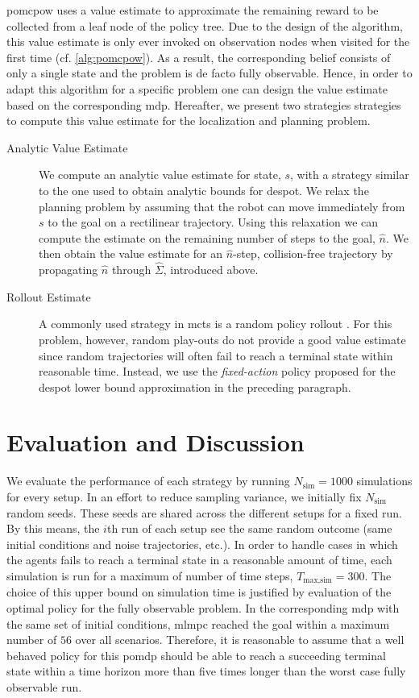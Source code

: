 \ac{pomcpow} uses a value estimate to approximate the remaining reward to be
collected from a leaf node of the policy tree. Due to the design of the
algorithm, this value estimate is only ever invoked on observation nodes when
visited for the first time (cf. \cref{alg:pomcpow}). As a result, the
corresponding belief consists of only a single state and the problem is de
facto fully observable. Hence, in order to adapt this algorithm for a specific
problem one can design the value estimate based on the corresponding \ac{mdp}.
Hereafter, we present two strategies strategies to compute this value estimate
for the localization and planning problem.

\begin{description}
  \item[Analytic Value Estimate] We compute an analytic value estimate for
    state, $s$, with a strategy similar to the one used to obtain analytic
    bounds for \ac{despot}. We relax the planning problem by assuming that the
    robot can move immediately from $s$ to the goal on a rectilinear
    trajectory. Using this relaxation we can compute the estimate on the
    remaining number of steps to the goal, $\hat{n}$. We then obtain the value
    estimate for an $\hat{n}$-step, collision-free trajectory by propagating
    $\hat{n}$ through $\hat{\Sigma}$, introduced above.
  \item[Rollout Estimate] A commonly used strategy in \ac{mcts} is a random
    policy rollout \cite{browne2012survey}. For this problem, however, random
    play-outs do not provide a good value estimate since random trajectories
    will often fail to reach a terminal state within reasonable time. Instead,
    we use the \emph{fixed-action} policy proposed for the \ac{despot} lower
    bound approximation in the preceding paragraph.
\end{description}

\section{Evaluation and Discussion}\label{sec:lp-evaluation}

We evaluate the performance of each strategy by running $N_\text{sim} = 1000$
simulations for every setup. In an effort to reduce sampling variance, we
initially fix $N_\text{sim}$ random seeds. These seeds are shared across the
different setups for a fixed run. By this means, the $i$th run of each setup
see the same random outcome (\ie same initial conditions and noise
trajectories, etc.). In order to handle cases in which the agents fails to
reach a terminal state in a reasonable amount of time, each simulation is run
for a maximum of number of time steps, $T_\text{max,sim} = 300$. The choice of
this upper bound on simulation time is justified by evaluation of the optimal
policy for the fully observable problem. In the corresponding \ac{mdp} with the
same set of initial conditions, \ac{mlmpc} reached the goal within a maximum
number of $56$ over all scenarios. Therefore, it is reasonable to assume that
a well behaved policy for this \ac{pomdp} should be able to reach a succeeding
terminal state within a time horizon more than five times longer than the worst
case fully observable run.

